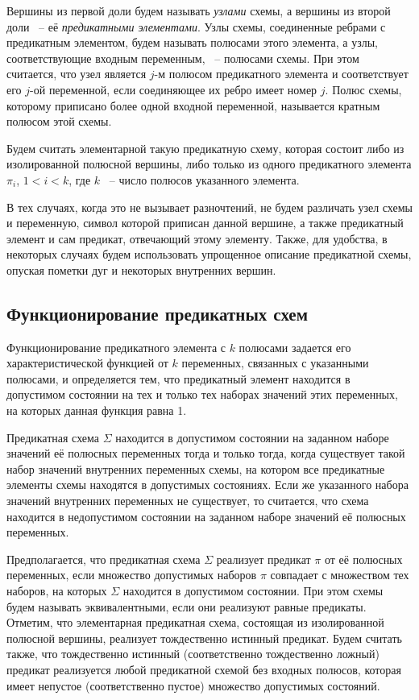 \documentclass[12pt]{article}
\begin{document}
Вершины из первой доли будем называть \textit{узлами} схемы, а вершины из второй доли ~-- её \textit{предикатными элементами}. 
Узлы схемы, соединенные ребрами с предикатным элементом, будем называть полюсами этого элемента, 
а узлы, соответствующие входным переменным, ~-- полюсами схемы.
При этом считается, что узел является $j$-м полюсом предикатного элемента и соответствует 
его $j$-ой переменной, если соединяющее их ребро имеет номер $j$. Полюс схемы, которому приписано 
более одной входной переменной, называется кратным полюсом этой схемы. 

Будем считать элементарной такую предикатную схему, которая состоит либо из изолированной полюсной вершины, 
либо только из одного предикатного элемента $\pi_i$, $1 < i < k$, где $k$ ~-- число полюсов указанного элемента.

В тех случаях, когда это не вызывает разночтений, 
не будем различать узел схемы и переменную, 
символ которой приписан данной вершине, а также предикатный элемент и сам предикат, отвечающий этому элементу. 
Также, для удобства, в некоторых случаях будем использовать упрощенное описание предикатной схемы, 
опуская пометки дуг и некоторых внутренних вершин. 

\subsection{Функционирование предикатных схем}
\label{func}
Функционирование предикатного элемента с $k$ полюсами задается его характеристической функцией от $k$ переменных, 
связанных с указанными полюсами, и определяется тем, что предикатный элемент находится в допустимом состоянии на тех и 
только тех наборах значений этих переменных, на которых данная функция равна 1. 

Предикатная схема $\Sigma$ находится в допустимом состоянии на заданном наборе значений её полюсных переменных тогда и только тогда, 
когда существует такой набор значений внутренних переменных схемы, на котором все предикатные элементы схемы находятся в допустимых состояниях. 
Если же указанного набора значений внутренних переменных не существует, то считается, что схема находится в недопустимом состоянии на 
заданном наборе значений её полюсных переменных.

Предполагается, что предикатная схема $\Sigma$ реализует предикат $\pi$ от её полюсных переменных, если множество допустимых наборов $\pi$ 
совпадает с множеством тех наборов, на которых $\Sigma$ находится в допустимом состоянии. 
При этом схемы будем называть эквивалентными, если они реализуют равные предикаты. 
Отметим, что элементарная предикатная схема, состоящая из изолированной полюсной вершины, реализует тождественно истинный предикат.
 Будем считать также, что тождественно истинный (соответственно тождественно ложный)
 предикат реализуется любой предикатной схемой без входных полюсов, 
которая имеет непустое (соответственно пустое) множество допустимых состояний.
\end{document}
